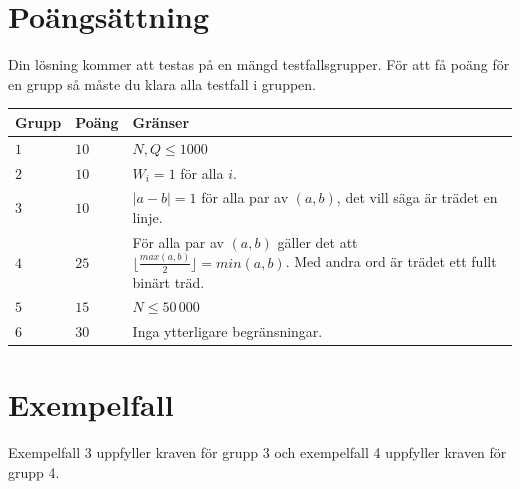 \section*{Poängsättning}
Din lösning kommer att testas på en mängd testfallsgrupper.
För att få poäng för en grupp så måste du klara alla testfall i gruppen.

\noindent
\begin{tabular}{| l | l | p{12cm} |}
  \hline
  \textbf{Grupp} & \textbf{Poäng} & \textbf{Gränser} \\ \hline
  $1$    & $10$       & $N, Q \leq 1000$ \\ \hline
  $2$    & $10$       & $W_i=1$ för alla $i$. \\ \hline
  $3$    & $10$       & $|a-b|=1$ för alla par av $(a,b)$, det vill säga är trädet en linje. \\ \hline
  $4$    & $25$       & För alla par av $(a,b)$ gäller det att $\lfloor\frac{max(a,b)}{2} \rfloor=min(a,b)$.
  Med andra ord är trädet ett fullt binärt träd. \\ \hline
  $5$    & $15$       & $N \leq 50\,000$ \\ \hline
  $6$    & $30$       & Inga ytterligare begränsningar. \\ \hline
\end{tabular}

\section*{Exempelfall}
Exempelfall 3 uppfyller kraven för grupp 3 och exempelfall 4 uppfyller kraven för grupp 4.
